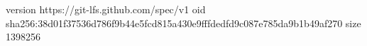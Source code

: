 version https://git-lfs.github.com/spec/v1
oid sha256:38d01f37536d786f9b44e5fcd815a430e9fffdedfd9c087e785da9b1b49af270
size 1398256
